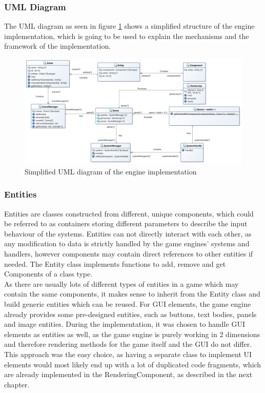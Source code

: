 \subsubsection{UML Diagram}\label{subsubsec:uml-diagram}
The UML diagram as seen in figure \ref{fig:ecs-block-diagram} shows a simplified structure of the engine implementation, which is going to be used to explain the mechanisms
and the framework of the implementation.
\begin{figure}
    \centering
    \includegraphics[width=1.0\textwidth]{./Pictures/res/implementation/ecs-uml}
    \caption{Simplified UML diagram of the engine implementation}
    \label{fig:ecs-block-diagram}
\end{figure}

\subsubsection{Entities}\label{subsubsec:entities}
Entities are classes constructed from different, unique components, which could be referred to as containers storing different parameters to
describe the input behaviour of the systems.
Entities can not directly interact with each other, as any modification to data is strictly handled by the game engines' systems and handlers,
however components may contain direct references to other entities if needed.
The Entity class implements functions to add, remove and get Components of a class type.
\\
As there are usually lots of different types of entities in a game which may contain the same components, it makes sense to inherit from the Entity class and
build generic entities which can be reused.
For GUI elements, the game engine already provides some pre-designed entities, such as buttons, text bodies, panels and image entities.
During the implementation, it was chosen to handle GUI elements as entities as well, as the game engine is purely working in 2 dimensions and therefore
rendering methods for the game itself and the GUI do not differ.
This approach was the easy choice, as having a separate class to implement UI elements would most likely end up with a lot of duplicated
code fragments, which are already implemented in the RenderingComponent, as described in the next chapter.
